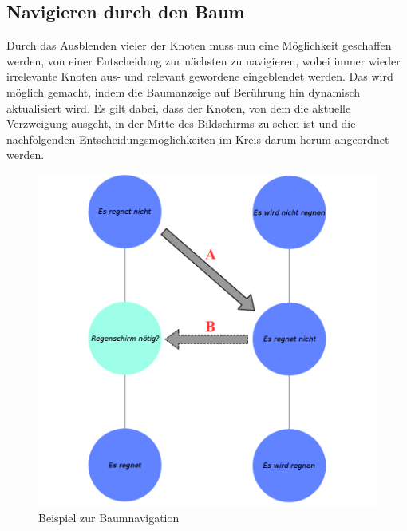 \subsection{Navigieren durch den Baum}\label{sec:dynamische_aktual}
Durch das Ausblenden vieler der Knoten muss nun eine Möglichkeit geschaffen werden, von einer Entscheidung zur nächsten zu navigieren, wobei immer wieder irrelevante Knoten aus- und relevant gewordene eingeblendet werden. Das wird möglich gemacht, indem die Baumanzeige auf Berührung hin dynamisch aktualisiert wird. Es gilt dabei, dass der Knoten, von dem die aktuelle Verzweigung ausgeht, in der Mitte des Bildschirms zu sehen ist und die nachfolgenden Entscheidungsmöglichkeiten im Kreis darum herum angeordnet werden.
\begin{figure}
	\centering
	\includegraphics[width=\linewidth]{../screenshots/baumnavigation.PNG}
	\caption{Beispiel zur Baumnavigation}
	\label{abb:baumnavigation}
\end{figure}
